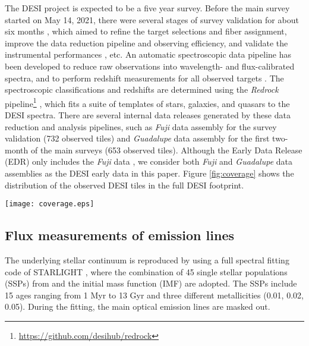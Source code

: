 \documentclass[twocolumn]{aastex631}
\begin{document}
The DESI project is expected to be a five year survey. Before the main survey started on May 14, 2021, there were several stages of survey validation for about six months \citep{Des23a}, which aimed to refine the target selections and fiber assignment, improve the data reduction pipeline and observing efficiency, and validate the instrumental performances \citep{Ale23,Bai23,Des23a,Kir23,Rai23a,Slf23,Lan23}, etc. An automatic spectroscopic data pipeline has been developed to reduce raw observations into wavelength- and flux-calibrated spectra, and to perform redshift measurements for all observed targets \citep{Guy23}.  The spectroscopic classifications and redshifts are determined using the \textit{Redrock} pipeline\footnote{\url{https://github.com/desihub/redrock}} \citep{Bai23,Bro23}, which fits a suite of templates of stars, galaxies, and quasars to the DESI spectra. There are several internal data releases generated by these data reduction and analysis pipelines, such as \textit{Fuji} data assembly for the survey validation (732 observed tiles) and \textit{Guadalupe} data assembly for the first two-month of the main surveys (653 observed tiles). Although the Early Data Release (EDR) only includes the \textit{Fuji} data \citet{Des23b}, we consider both \textit{Fuji} and \textit{Guadalupe} data assemblies as the DESI early data in this paper. Figure \ref{fig:coverage} shows the distribution of the observed DESI tiles in the full DESI footprint. 

\begin{figure*}[ht!]
\centering
\texttt{[image: coverage.eps]}
\caption{Sky coverage of the DESI early data in Aitoff projection. The black lines delineate the DESI baseline footprint of about 14,000 square degrees. The dotted line shows the Galactic plane. The circles represent the centers of 3.2-degree DESI tiles (blue for \textit{Fuji} and red for \textit{Guadalupe}). Note that a few \textit{Fuji} tiles are located outside of the DESI footprint. \label{fig:coverage}}
\end{figure*}


\subsection{Flux measurements of emission lines}
The underlying stellar continuum is reproduced by using a full spectral fitting code of STARLIGHT \citet{Cid05}, where the combination of 45 single stellar populations (SSPs) from \citet{Bru03} and the \citet{Cha03} initial mass function (IMF) are adopted. The SSPs include 15 ages ranging from 1 Myr to 13 Gyr and three different metallicities (0.01, 0.02, 0.05). During the fitting, the main optical emission lines are masked out. 
 
\end{document}
